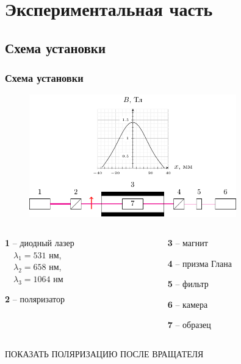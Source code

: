 \documentclass[10pt,pdf,hyperref={unicode}, dvipsnames, handout]{beamer}
\begin{document}
\section{Экспериментальная часть}
\begin{frame}
	\subsection{Схема установки}
	\frametitle{Схема установки}
	\begin{figure}[tb]
		\centering
		\includegraphics[width=0.8\textwidth]{img/chem}
	\end{figure}
	\begin{columns}
		\hspace{2.5cm}
		\begin{column}{0.3\textwidth}
			
			
			\textbf{1} -- диодный лазер\\ 
			$\quad\lambda_1=531$ нм,\\
			$\quad\lambda_2=658$ нм,\\
			$\quad\lambda_3=1064$ нм
			
			
			\textbf{2} -- поляризатор
			
		\end{column}
		\hspace{1.6cm}
		\begin{column}{0.7\textwidth}
			
			\textbf{3} -- магнит
			
			\textbf{4} -- призма Глана
			
			\textbf{5} -- фильтр
			
			\textbf{6} -- камера
			
			\textbf{7} -- образец
		\end{column}
	\end{columns}
	ПОКАЗАТЬ ПОЛЯРИЗАЦИЮ ПОСЛЕ ВРАЩАТЕЛЯ
\end{frame}
\end{document}
